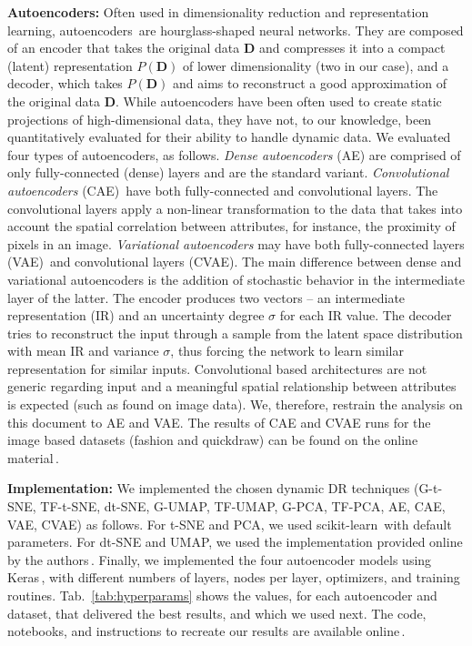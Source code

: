 \noindent\textbf{Autoencoders:} Often used in dimensionality reduction and representation learning, autoencoders\,\cite{aes,Ballard1987} are hourglass-shaped neural networks. They are composed of an encoder that takes the original data $\mathbf{D}$ and compresses it into a compact (latent) representation $P(\mathbf{D})$ of lower dimensionality (two in our case), and a decoder, which takes $P(\mathbf{D})$ and aims to reconstruct a good approximation of the original data $\mathbf{D}$. While autoencoders have been often used to create static projections of high-dimensional data, they have not, to our knowledge, been quantitatively evaluated for their ability to handle dynamic data. We evaluated four types of autoencoders, as follows. \emph{Dense autoencoders} (AE) are comprised of only fully-connected (dense) layers and are the standard variant. \emph{Convolutional autoencoders} (CAE)\,\cite{Masci2011} have both fully-connected and convolutional layers. The convolutional layers apply a non-linear transformation to the data that takes into account the spatial correlation between attributes, for instance, the proximity of pixels in an image. \emph{Variational autoencoders} may have both fully-connected layers (VAE)\,\cite{Kingma2013} and convolutional layers (CVAE). The main difference between dense and variational autoencoders is the addition of stochastic behavior in the intermediate layer of the latter. The encoder produces two vectors -- an intermediate representation (IR) and an uncertainty degree $\sigma$ for each IR value. The decoder tries to reconstruct the input through a sample from the latent space distribution with mean IR and variance $\sigma$, thus forcing the network to learn similar representation for similar inputs.
Convolutional based architectures are not generic regarding input and a meaningful spatial relationship between attributes is expected (such as found on image data). We, therefore, restrain the analysis on this document to AE and VAE. The results of CAE and CVAE runs for the image based datasets (fashion and quickdraw) can be found on the online material\,\cite{repo}.


\noindent\textbf{Implementation:} We implemented the chosen dynamic DR techniques (G-t-SNE, TF-t-SNE, dt-SNE, G-UMAP, TF-UMAP, G-PCA, TF-PCA, AE, CAE, VAE, CVAE) as follows. For t-SNE and PCA, we used scikit-learn\,\cite{scikit-learn} with default parameters. For dt-SNE and UMAP, we used the implementation provided online by the authors\,\cite{Rauber2016,umap}. Finally, we implemented the four autoencoder models using Keras\,\cite{chollet2015keras}, with different numbers of layers, nodes per layer, optimizers, and training routines. Tab.~\ref{tab:hyperparams} shows the values, for each autoencoder and dataset, that delivered the best results, and which we used next. The code, notebooks, and instructions to recreate our results are available online\,\cite{repo}.

